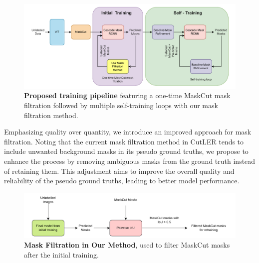 \begin{figure}
	\centering
	\includegraphics[width=1\textwidth]{Images/main/our_approach.pdf}
	\caption[\textbf{Proposed Training Pipeline}]{\textbf{Proposed training pipeline} featuring a one-time MaskCut mask filtration followed by multiple self-training loops with our mask filtration method.}
	\label{fig:proposed_training}
\end{figure}
Emphasizing quality over quantity, we introduce an improved approach for mask filtration. Noting that the current mask filtration method in CutLER tends to include unwanted background masks in its pseudo ground truths, we propose to enhance the process by removing ambiguous masks from the ground truth instead of retaining them. This adjustment aims to improve the overall quality and reliability of the pseudo ground truths, leading to better model performance.

\begin{figure}
	\centering
	\includegraphics[width=1\textwidth]{Images/main/our_mask_filtration_1.pdf}
	\caption[\textbf{Mask Filtration in Proposed Method}]{\textbf{Mask Filtration in Our Method}, used to filter MaskCut masks after the initial training.}
	\label{fig:our_mask_filtration}
\end{figure}


